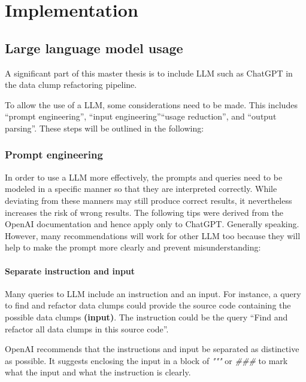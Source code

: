 
\begingroup
\renewcommand{\cleardoublepage}{} %
\renewcommand{\clearpage}{}
\chapter{Implementation}\label{chapter:implementation}
\endgroup

\section{Large language model usage}
A significant part of this master thesis is to include \ac{LLM} such as ChatGPT in the data clump refactoring pipeline. 

To allow the use of a \ac{LLM}, some considerations need to be made. This includes \enquote{prompt engineering}, \enquote{input engineering}\enquote{usage reduction}, and   \enquote{output parsing}. These steps will be outlined in the following:



\subsection{Prompt engineering}\label{sec:prompt_engineering}


In order to use a \ac{LLM} more effectively, the prompts and queries need to be modeled in a specific manner so that they are interpreted correctly. While deviating from these manners may still produce correct results, it nevertheless increases the risk of wrong results. The following tips were derived from the OpenAI documentation \cite{ChatGPT_url} and hence apply only to ChatGPT. Generally speaking. However, many recommendations will work for other \ac{LLM} too because they will help to make the prompt more clearly and prevent misunderstanding:

\subsubsection{Separate instruction and input}
Many queries to \ac{LLM} include an instruction and an input. For instance, a query to find and refactor data clumps could  provide the source code containing the possible data clumps \textbf{(input)}. The instruction could be the query \enquote{Find and refactor all data clumps in this source code}. 

OpenAI recommends that the instructions and input be separated as distinctive as possible. It suggests enclosing the input in a block of \textit{"""} or \textit{\#\#\#} to mark what the input and what the instruction is clearly.

